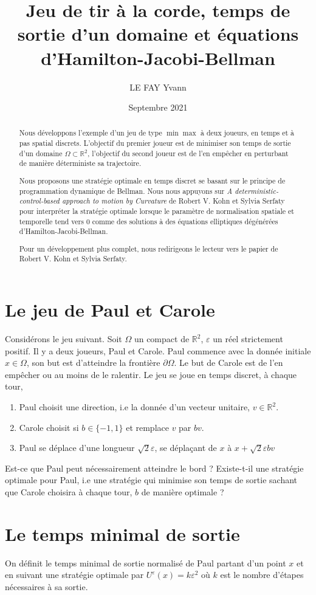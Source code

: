 \documentclass{article}
\begin{document}
\title{Jeu de tir à la corde, temps de sortie d'un domaine et équations d'Hamilton-Jacobi-Bellman}
\author{LE FAY Yvann}
\date{Septembre 2021}
\newpage
\begin{abstract}
	Nous développons l'exemple d'un jeu de type $\min \max$ à deux joueurs, en temps et à pas spatial discrets. L'objectif du premier joueur est de minimiser son temps de sortie d'un domaine $\Omega\subset \mathbb{R}^2$, l'objectif du second joueur est de l'en empêcher en perturbant de manière déterministe sa trajectoire. 

	Nous proposons une stratégie optimale en temps discret se basant sur le principe de programmation dynamique de Bellman. Nous nous appuyons sur \textit{A deterministic-control-based approach to motion by Curvature} de Robert V. Kohn et Sylvia Serfaty pour interpréter la stratégie optimale lorsque le paramètre de normalisation spatiale et temporelle tend vers $0$ comme des solutions à des équations elliptiques dégénérées d'Hamilton-Jacobi-Bellman.
	
	Pour un développement plus complet, nous redirigeons le lecteur vers le papier de Robert V. Kohn et Sylvia Serfaty.
\end{abstract}
\section{Le jeu de Paul et Carole}
Considérons le jeu suivant. Soit $\Omega$ un compact de $\mathbb{R}^2$, $\varepsilon$ un réel strictement positif. Il y a deux joueurs, Paul et Carole. Paul commence avec la donnée initiale $x\in\Omega$, son but est d'atteindre la frontière $\partial\Omega$. Le but de Carole est de l'en empêcher ou au moins de le ralentir. Le jeu se joue en temps discret, à chaque tour,
\begin{enumerate}
	\item Paul choisit une direction, i.e la donnée d'un vecteur unitaire, $v\in\mathbb{R}^2$.
	\item Carole choisit si $b\in\{-1, 1\}$ et remplace $v$ par $bv$.
	\item Paul se déplace d'une longueur $\sqrt{2}\varepsilon$, se déplaçant de $x$ à $x+\sqrt{2}\varepsilon bv$
\end{enumerate}
Est-ce que Paul peut nécessairement atteindre le bord ? Existe-t-il une stratégie optimale pour Paul, i.e une stratégie qui minimise son temps de sortie sachant que Carole choisira à chaque tour, $b$ de manière optimale ?

\section{Le temps minimal de sortie}
On définit le temps minimal de sortie normalisé de Paul partant d'un point $x$ et en suivant une stratégie optimale par $U^\varepsilon(x) = k\varepsilon^2$ où $k$ est le nombre d'étapes nécessaires à sa sortie.
\end{document}
